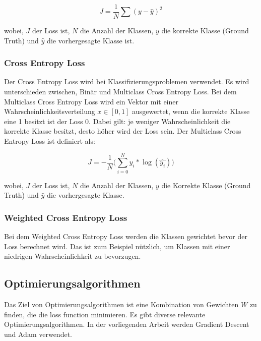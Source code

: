 \begin{equation}
  J = \frac{1}{N} \sum (y - \hat{y})^2
\end{equation}

wobei, $J$ der Loss ist, $N$ die Anzahl der Klassen, $y$ die korrekte Klasse (Ground Truth) und $ \hat{y}$ die vorhergesagte Klasse ist.

\subsubsection{Cross Entropy Loss}
Der Cross Entropy Loss wird bei Klassifizierungsproblemen verwendet. Es wird unterschieden zwischen, Binär und Multiclass Cross Entropy Loss. 
Bei dem Multiclass Cross Entropy Loss wird ein Vektor mit einer Wahrscheinlichkeitsverteilung $ x \in [0, 1] $ 
ausgewertet, wenn die korrekte Klasse eine 1 besitzt ist der Loss 0. Dabei gilt: je weniger Wahrscheinlichkeit die korrekte Klasse besitzt, 
desto höher wird der Loss sein. Der Multiclass Cross Entropy Loss ist definiert als: 

\begin{equation}
  J = -\frac{1}{N} \Big(\sum_{i=0}^N y_{i} * \log(\hat{y_{i}})\Big)
\end{equation}

wobei, $J$ der Loss ist, $N$ die Anzahl der Klassen, $y$ die Korrekte Klasse (Ground Truth) und $ \hat{y}$ die vorhergesagte Klasse.

\subsubsection{Weighted Cross Entropy Loss}
Bei dem Weighted Cross Entropy Loss werden die Klassen gewichtet bevor der Loss berechnet wird. Das ist zum Beispiel nützlich, um Klassen  
mit einer niedrigen Wahrscheinlichkeit zu bevorzugen.

\subsection{Optimierungsalgorithmen}
Das Ziel von Optimierungsalgorithmen ist eine Kombination von Gewichten $ W $ zu finden, die die \gls{loss function} minimieren.
Es gibt diverse relevante Optimierungsalgorithmen. In der vorliegenden Arbeit werden Gradient Descent und Adam verwendet.

